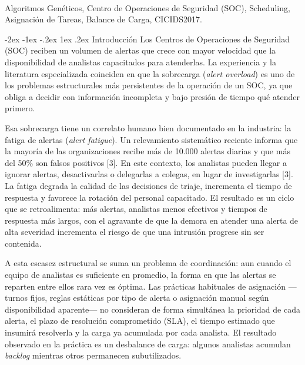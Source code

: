 \documentclass[12pt,a4paper,twocolumn]{article}
\makeatletter
\renewcommand{\section}{\@startsection{section}{1}{\z@}%
  {-2ex \@plus -1ex \@minus -.2ex}%
  {1ex \@plus.2ex}%
  {\fontsize{12}{14}\selectfont\bfseries}}
\makeatother
\begin{document}
 \\
{\fontsize{10}{12}\selectfont
Algoritmos Genéticos, Centro de Operaciones de Seguridad (SOC), Scheduling, Asignación de Tareas, Balance de Carga, CICIDS2017.\par}
\vspace{1em}

\section{Introducción}
Los Centros de Operaciones de Seguridad (SOC) reciben un volumen de alertas que crece con mayor velocidad que la disponibilidad de analistas capacitados para atenderlas. La experiencia y la literatura especializada coinciden en que la sobrecarga (\textit{alert overload}) es uno de los problemas estructurales más persistentes de la operación de un SOC, ya que obliga a decidir con información incompleta y bajo presión de tiempo qué atender primero.

Esa sobrecarga tiene un correlato humano bien documentado en la industria: la fatiga de alertas (\textit{alert fatigue}). Un relevamiento sistemático reciente informa que la mayoría de las organizaciones recibe más de 10.000 alertas diarias y que más del 50\% son falsos positivos [3]. En este contexto, los analistas pueden llegar a ignorar alertas, desactivarlas o delegarlas a colegas, en lugar de investigarlas [3]. La fatiga degrada la calidad de las decisiones de triaje, incrementa el tiempo de respuesta y favorece la rotación del personal capacitado. El resultado es un ciclo que se retroalimenta: más alertas, analistas menos efectivos y tiempos de respuesta más largos, con el agravante de que la demora en atender una alerta de alta severidad incrementa el riesgo de que una intrusión progrese sin ser contenida.

A esta escasez estructural se suma un problema de coordinación: aun cuando el equipo de analistas es suficiente en promedio, la forma en que las alertas se reparten entre ellos rara vez es óptima. Las prácticas habituales de asignación ---turnos fijos, reglas estáticas por tipo de alerta o asignación manual según disponibilidad aparente--- no consideran de forma simultánea la prioridad de cada alerta, el plazo de resolución comprometido (SLA), el tiempo estimado que insumirá resolverla y la carga ya acumulada por cada analista. El resultado observado en la práctica es un desbalance de carga: algunos analistas acumulan \textit{backlog} mientras otros permanecen subutilizados.
\end{document}
